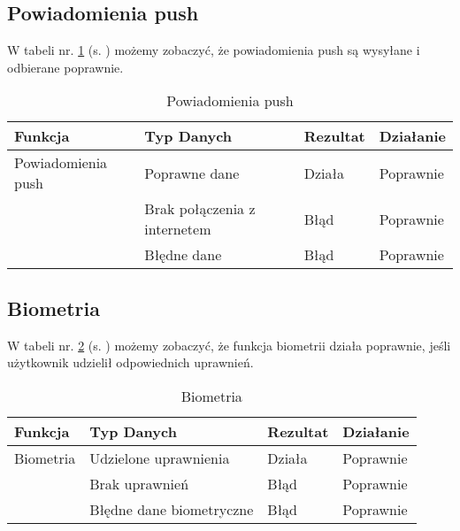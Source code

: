\subsection{Powiadomienia push}
W tabeli nr. \ref{tab:tabelka007} (s. \pageref{tab:tabelka007}) możemy zobaczyć, że powiadomienia push są wysyłane i odbierane poprawnie.
\begin{table}[h!]
	\centering
	\begin{tabularx}{\textwidth}{|X|>{\arraybackslash}m{}|X|X|}
		\hline
		\textbf{Funkcja}   & \textbf{Typ Danych}          & \textbf{Rezultat} & \textbf{Działanie} \\ \hline
		Powiadomienia push & Poprawne dane                & Działa            & Poprawnie          \\ \hline
		                   & Brak połączenia z internetem & Błąd              & Poprawnie          \\ \hline
		                   & Błędne dane                  & Błąd              & Poprawnie          \\ \hline
	\end{tabularx}
	\caption{Powiadomienia push}
	\label{tab:tabelka007}
\end{table}
\newpage
\subsection{Biometria}
W tabeli nr. \ref{tab:tabelka008} (s. \pageref{tab:tabelka008}) możemy zobaczyć, że funkcja biometrii działa poprawnie, jeśli użytkownik udzielił odpowiednich uprawnień.
\begin{table}[h!]
	\centering
	\begin{tabularx}{\textwidth}{|X|>{\arraybackslash}m{}|X|X|}
		\hline
		\textbf{Funkcja} & \textbf{Typ Danych}      & \textbf{Rezultat} & \textbf{Działanie} \\ \hline
		Biometria        & Udzielone uprawnienia    & Działa            & Poprawnie          \\ \hline
		                 & Brak uprawnień           & Błąd              & Poprawnie          \\ \hline
		                 & Błędne dane biometryczne & Błąd              & Poprawnie          \\ \hline
	\end{tabularx}
	\caption{Biometria}
	\label{tab:tabelka008}
\end{table}

